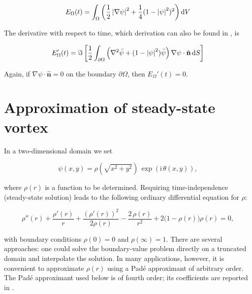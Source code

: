 \begin{equation}
    E_\Omega(t) = \int_\Omega \left( \frac12 \left| \nabla \psi \right|^2 + \frac14 (1 - \left| \psi \right|^2)^2 \right) \mathrm{d} V
    \label{eq:energy}
\end{equation}

The derivative with respect to time, which derivation can also be found in \cite{CZ21}, is

\[E_\Omega'(t) = \Im\left[\frac12 \int_{\partial \Omega} \left(\nabla^2 \bar{\psi} + (1 - \left| \psi \right|^2)\bar{\psi} \right)\nabla\psi \cdot \hat{\mathbf{n}} \,\mathrm{d} S \right] \]

Again, if $\nabla\psi \cdot \hat{\mathbf{n}} = 0$ on the boundary $\partial \Omega$, then $E_\Omega'(t) = 0$.

\section{Approximation of steady-state vortex}

In a two-dimensional domain we set

\[
    \psi(x,y)=\rho\left(\sqrt{x^2+y^2}\right)\,\exp\left(\mathrm{i}\,\theta(x,y)\right),
\]

where \(\rho(r)\) is a function to be determined. Requiring time-independence (steady-state solution) leads to the following ordinary differential equation for $\rho$:

\begin{equation}
    \rho''(r)+\frac{\rho'(r)}{r}+\frac{(\rho'(r))^2}{2\rho(r)}-\frac{2\,\rho(r)}{r^2}+2\bigl(1-\rho(r)\bigr)\rho(r)=0,
    \label{eq:density}
\end{equation}

with boundary conditions $\rho(0)=0$ and $\rho(\infty)=1$. There are several approaches: one could solve the boundary-value problem directly on a truncated domain and interpolate the solution. In many applications, however, it is convenient to approximate $\rho(r)$ using a Padé approximant of arbitrary order. The Padé approximant used below is of fourth order; its coefficients are reported in \cite{CZ21}.



